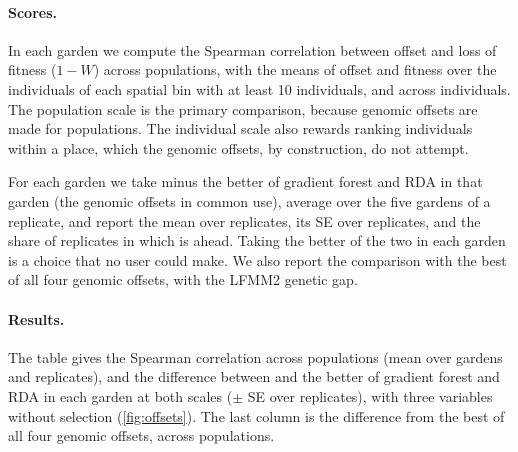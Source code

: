 \paragraph{Scores.} In each garden we compute the Spearman correlation
between offset and loss of fitness ($1 - W$) across populations, with the
means of offset and fitness over the individuals of each spatial bin with
at least 10 individuals, and across individuals. The population scale is
the primary comparison, because genomic offsets are made for populations.
The individual scale also rewards ranking individuals within a place,
which the genomic offsets, by construction, do not attempt.

For each garden we take \ecolocator minus the better of gradient forest
and RDA in that garden (the genomic offsets in common use), average over
the five gardens of a replicate, and report the mean over replicates, its
SE over replicates, and the share of replicates in which \ecolocator is
ahead. Taking the better of the two in each garden is a choice that no
user could make. We also report the comparison with the best of all four
genomic offsets, with the LFMM2 genetic gap.

\paragraph{Results.} The table gives the Spearman correlation across
populations (mean over gardens and replicates), and the difference between
\ecolocator and the better of gradient forest and RDA in each garden at
both scales ($\pm$ SE over replicates), with three variables without
selection (\cref{fig:offsets}). The last column is the difference from the
best of all four genomic offsets, across populations.

